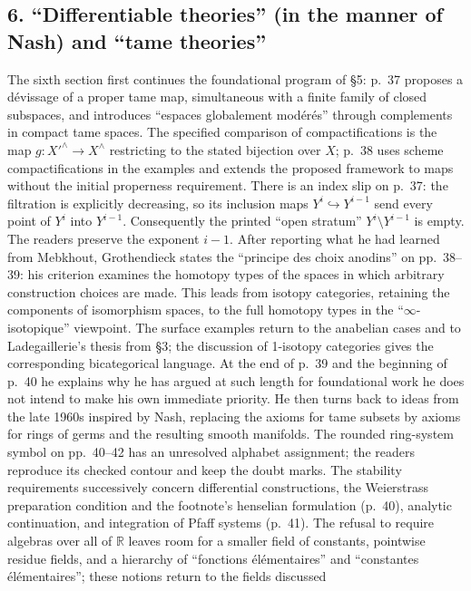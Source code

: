 \subsection*{6. ``Differentiable theories'' (in the manner of Nash) and ``tame theories''}
The sixth section first continues the foundational program of \S5:
p.~37 proposes a dévissage of a proper tame map, simultaneous with a
finite family of closed subspaces, and introduces ``espaces globalement
modérés'' through complements in compact tame spaces. The specified
comparison of compactifications is the map
$g:X'^{\wedge}\longrightarrow X^{\wedge}$ restricting to the stated
bijection over $X$; p.~38 uses scheme compactifications in the examples
and extends the proposed framework to maps without the initial properness
requirement. There is an index slip on p.~37: the filtration is explicitly
decreasing, so its inclusion maps
$Y^i\hookrightarrow Y^{i-1}$ send every point of $Y^i$ into
$Y^{i-1}$. Consequently the printed ``open stratum''
$Y^i\setminus Y^{i-1}$ is empty. The readers preserve the exponent
$i-1$. After reporting what he had learned from Mebkhout, Grothendieck
states the ``principe des choix anodins'' on pp.~38--39: his criterion
examines the homotopy types of the spaces in which arbitrary construction
choices are made. This leads from isotopy categories, retaining the
components of isomorphism spaces, to the full homotopy types in the
``$\infty$-isotopique'' viewpoint. The surface examples return to the
anabelian cases and to Ladegaillerie's thesis from \S3; the discussion of
1-isotopy categories gives the corresponding bicategorical language.
At the end of p.~39 and the beginning of p.~40 he explains why he has
argued at such length for foundational work he does not intend to make
his own immediate priority. He then turns back to ideas from the late
1960s inspired by Nash, replacing the axioms for tame subsets by axioms
for rings of germs and the resulting smooth manifolds. The rounded
ring-system symbol on pp.~40--42 has an unresolved alphabet assignment;
the readers reproduce its checked contour and keep the doubt marks.
The stability requirements successively concern differential constructions,
the Weierstrass preparation condition and the footnote's henselian
formulation (p.~40), analytic continuation, and integration of Pfaff
systems (p.~41). The refusal to require algebras over all of
$\mathbb R$ leaves room for a smaller field of constants, pointwise
residue fields, and a hierarchy of ``fonctions élémentaires'' and
``constantes élémentaires''; these notions return to the fields discussed
